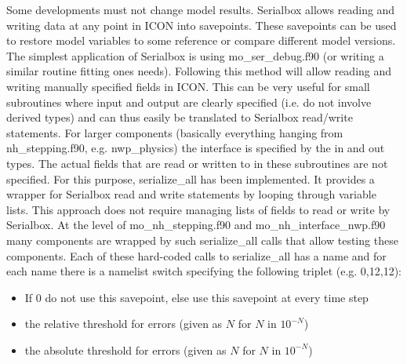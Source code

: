 Some developments must not change model results. Serialbox allows reading and writing data at any point in ICON into savepoints. These savepoints can be used to restore model variables to some reference or compare different model versions. The simplest application of Serialbox is using mo\_ser\_debug.f90 (or writing a similar routine fitting ones needs). Following this method will allow reading and writing manually specified fields in ICON. This can be very useful for small subroutines where input and output are clearly specified (i.e. do not involve derived types) and can thus easily be translated to Serialbox read/write statements. For larger components (basically everything hanging from nh\_stepping.f90, e.g. nwp\_physics) the interface is specified by the in and out types. The actual fields that are read or written to in these subroutines are not specified. For this purpose, serialize\_all has been implemented. It provides a wrapper for Serialbox read and write statements by looping through variable lists. This approach does not require managing lists of fields to read or write by Serialbox. At the level of mo\_nh\_stepping.f90 and mo\_nh\_interface\_nwp.f90 many components are wrapped by such serialize\_all calls that allow testing these components. Each of these hard-coded calls to serialize\_all has a name and for each name there is a namelist switch specifying the following triplet (e.g. 0,12,12):
\begin{itemize}
  \item If 0 do not use this savepoint, else use this savepoint at every time step
  \item the relative threshold for errors (given as $N$ for $N$ in $10^{-N}$)
  \item the absolute threshold for errors (given as $N$ for $N$ in $10^{-N}$)
\end{itemize}

